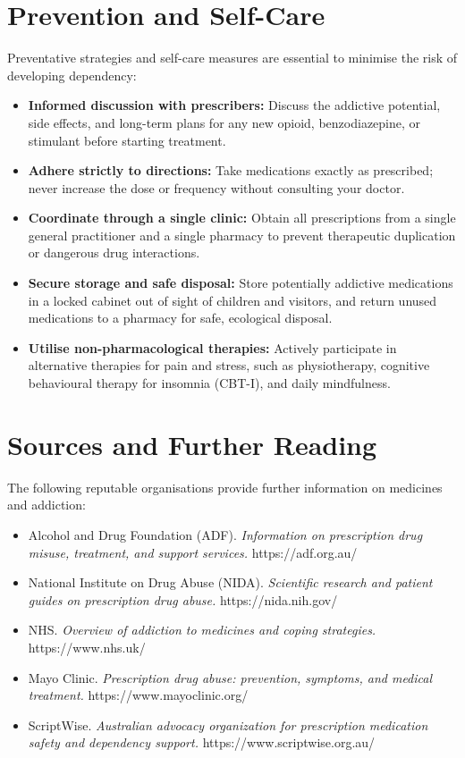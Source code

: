 \section*{Prevention and Self-Care}
Preventative strategies and self-care measures are essential to minimise the risk of developing dependency:
\begin{itemize}
    \item \textbf{Informed discussion with prescribers:} Discuss the addictive potential, side effects, and long-term plans for any new opioid, benzodiazepine, or stimulant before starting treatment.
    \item \textbf{Adhere strictly to directions:} Take medications exactly as prescribed; never increase the dose or frequency without consulting your doctor.
    \item \textbf{Coordinate through a single clinic:} Obtain all prescriptions from a single general practitioner and a single pharmacy to prevent therapeutic duplication or dangerous drug interactions.
    \item \textbf{Secure storage and safe disposal:} Store potentially addictive medications in a locked cabinet out of sight of children and visitors, and return unused medications to a pharmacy for safe, ecological disposal.
    \item \textbf{Utilise non-pharmacological therapies:} Actively participate in alternative therapies for pain and stress, such as physiotherapy, cognitive behavioural therapy for insomnia (CBT-I), and daily mindfulness.
\end{itemize}

\section*{Sources and Further Reading}
The following reputable organisations provide further information on medicines and addiction:
\begin{itemize}
    \item Alcohol and Drug Foundation (ADF). \textit{Information on prescription drug misuse, treatment, and support services.} https://adf.org.au/
    \item National Institute on Drug Abuse (NIDA). \textit{Scientific research and patient guides on prescription drug abuse.} https://nida.nih.gov/
    \item NHS. \textit{Overview of addiction to medicines and coping strategies.} https://www.nhs.uk/
    \item Mayo Clinic. \textit{Prescription drug abuse: prevention, symptoms, and medical treatment.} https://www.mayoclinic.org/
    \item ScriptWise. \textit{Australian advocacy organization for prescription medication safety and dependency support.} https://www.scriptwise.org.au/
\end{itemize}

